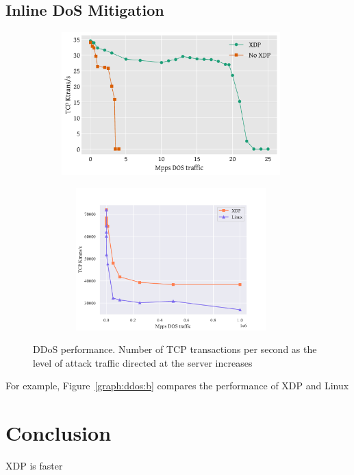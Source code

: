 \documentclass[12pt,titlepage]{article}
\begin{document}
\subsection{Inline DoS Mitigation}

\begin{figure}
    \centering
    \begin{minipage}{0.49\textwidth}
        \centering
        \includegraphics[width=0.95\textwidth,height=5.5cm]{original/ddos-test.pdf} %
        \label{graph:ddos:a}
    \end{minipage}\hfill
    \begin{minipage}{0.49\textwidth}
        \centering
        \includegraphics[width=0.95\textwidth,height=5.5cm]{img/dos-test.pdf} %
        \label{graph:ddos:b}
    \end{minipage}
     \caption{DDoS performance. Number of TCP transactions per second as the level of attack traffic directed at the server increases}
     \label{graph:ddos}
\end{figure}

For example, Figure~\ref{graph:ddos:b} compares the performance of XDP and Linux


\section{Conclusion}

XDP is faster




\begin{spacing}{1}


\end{spacing}
\end{document}

